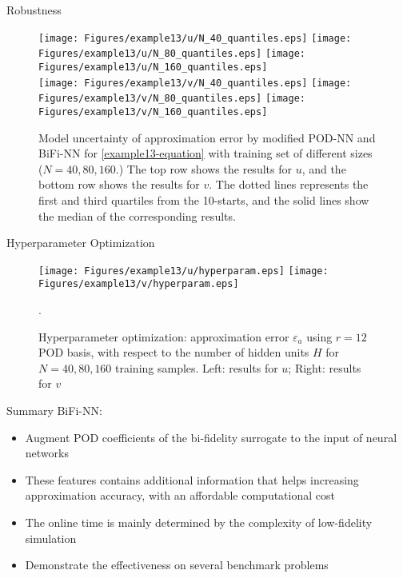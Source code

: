 \documentclass[10pt]{beamer}
\begin{document}
\begin{frame}{Robustness}
\begin{figure}[ht]
    \centering
    \vbox{
    \texttt{[image: Figures/example13/u/N\_40\_quantiles.eps]}
    \texttt{[image: Figures/example13/u/N\_80\_quantiles.eps]}
    \texttt{[image: Figures/example13/u/N\_160\_quantiles.eps]}
    \\
    \texttt{[image: Figures/example13/v/N\_40\_quantiles.eps]}
    \texttt{[image: Figures/example13/v/N\_80\_quantiles.eps]}
    \texttt{[image: Figures/example13/v/N\_160\_quantiles.eps]}
    }
    \caption{Model uncertainty of approximation error by modified POD-NN and BiFi-NN for \eqref{example13-equation} with training set of different sizes ($N = 40, 80, 160$.) The top row shows the results for $u$, and the bottom row shows the results for $v$. The dotted lines represents the first and third quartiles from the 10-starts, and the solid lines show the median of the corresponding results.}
    \label{example13-quantiles}
\end{figure}
\end{frame}

\begin{frame}{Hyperparameter Optimization}
\begin{figure}[htbp]
\centering
\vbox{
\texttt{[image: Figures/example13/u/hyperparam.eps]}
\texttt{[image: Figures/example13/v/hyperparam.eps]}
}
\caption{Hyperparameter optimization: approximation error $\varepsilon_a$ using $r = 12 $ POD basis, with respect to the number of hidden units $H$ for $N=40, 80, 160$ training samples. Left: results for $u$; Right: results for $v$}.
\label{example13-hyperparam}
\end{figure}
\end{frame}

\begin{frame}{Summary}
BiFi-NN:
\begin{itemize}
	\item Augment POD coefficients of the bi-fidelity surrogate to the input of neural networks
	\item These features contains additional information that helps increasing approximation accuracy, with an affordable computational cost
	\item The online time is mainly determined by the complexity of low-fidelity simulation
	\item Demonstrate the effectiveness on several benchmark problems
\end{itemize}
\end{frame}
\end{document}
